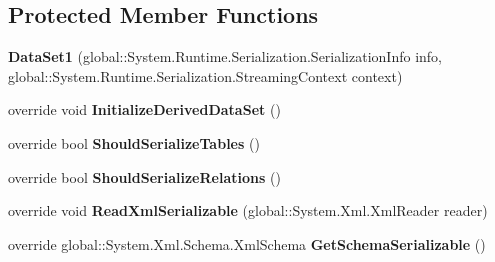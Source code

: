 \subsection*{Protected Member Functions}
\begin{DoxyCompactItemize}
\item 
\mbox{\label{classprojekt_1_1_data_set1_a276b4a5f57cb8de1a39b36dedefe7613}} 
{\bfseries Data\+Set1} (global\+::\+System.\+Runtime.\+Serialization.\+Serialization\+Info info, global\+::\+System.\+Runtime.\+Serialization.\+Streaming\+Context context)
\item 
\mbox{\label{classprojekt_1_1_data_set1_a0a252a70e692ec9dc27bfe7371ce3f1b}} 
override void {\bfseries Initialize\+Derived\+Data\+Set} ()
\item 
\mbox{\label{classprojekt_1_1_data_set1_a3a1de8b5f42f1062608d6c1c683cd5bd}} 
override bool {\bfseries Should\+Serialize\+Tables} ()
\item 
\mbox{\label{classprojekt_1_1_data_set1_a59de6c98c70128509a6461654eea2766}} 
override bool {\bfseries Should\+Serialize\+Relations} ()
\item 
\mbox{\label{classprojekt_1_1_data_set1_a5a88a43948496bdc4d9ddcafd794d957}} 
override void {\bfseries Read\+Xml\+Serializable} (global\+::\+System.\+Xml.\+Xml\+Reader reader)
\item 
\mbox{\label{classprojekt_1_1_data_set1_a33a74f619d82064876ccb5caf72a83ff}} 
override global\+::\+System.\+Xml.\+Schema.\+Xml\+Schema {\bfseries Get\+Schema\+Serializable} ()
\end{DoxyCompactItemize}

